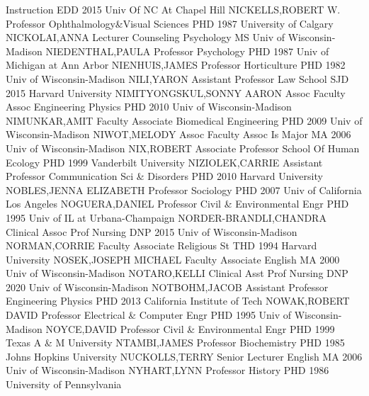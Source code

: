 \documentclass[
]{article}
\begin{document}
Instruction \textbar EDD 2015 Univ Of NC At Chapel Hill
\textbar NICKELLS,ROBERT W. \textbar{}  \textbar Professor
\textbar Ophthalmology\&Visual Sciences \textbar PHD 1987 University of
Calgary \textbar NICKOLAI,ANNA \textbar{}  \textbar Lecturer
\textbar Counseling Psychology \textbar MS Univ of Wisconsin-Madison
\textbar NIEDENTHAL,PAULA \textbar{}  \textbar Professor
\textbar Psychology \textbar PHD 1987 Univ of Michigan at Ann Arbor
\textbar NIENHUIS,JAMES \textbar{}  \textbar Professor
\textbar Horticulture \textbar PHD 1982 Univ of Wisconsin-Madison
\textbar NILI,YARON \textbar{}  \textbar Assistant Professor
\textbar Law School \textbar SJD 2015 Harvard University
\textbar NIMITYONGSKUL,SONNY AARON \textbar{} 
\textbar Assoc Faculty Assoc \textbar Engineering Physics \textbar PHD
2010 Univ of Wisconsin-Madison \textbar NIMUNKAR,AMIT \textbar{}
 \textbar Faculty Associate \textbar Biomedical Engineering
\textbar PHD 2009 Univ of Wisconsin-Madison \textbar NIWOT,MELODY
\textbar{}  \textbar Assoc Faculty Assoc \textbar Is Major
\textbar MA 2006 Univ of Wisconsin-Madison \textbar NIX,ROBERT
\textbar{}  \textbar Associate Professor \textbar School Of
Human Ecology \textbar PHD 1999 Vanderbilt University
\textbar NIZIOLEK,CARRIE \textbar{}  \textbar Assistant
Professor \textbar Communication Sci \& Disorders \textbar PHD 2010
Harvard University \textbar NOBLES,JENNA ELIZABETH \textbar{}
 \textbar Professor \textbar Sociology \textbar PHD 2007
Univ of California Los Angeles \textbar NOGUERA,DANIEL \textbar{}
 \textbar Professor \textbar Civil \& Environmental Engr
\textbar PHD 1995 Univ of IL at Urbana-Champaign
\textbar NORDER-BRANDLI,CHANDRA \textbar{} 
\textbar Clinical Assoc Prof \textbar Nursing \textbar DNP 2015 Univ of
Wisconsin-Madison \textbar NORMAN,CORRIE \textbar{} 
\textbar Faculty Associate \textbar Religious St \textbar THD 1994
Harvard University \textbar NOSEK,JOSEPH MICHAEL \textbar{} 
\textbar Faculty Associate \textbar English \textbar MA 2000 Univ of
Wisconsin-Madison \textbar NOTARO,KELLI \textbar{} 
\textbar Clinical Asst Prof \textbar Nursing \textbar DNP 2020 Univ of
Wisconsin-Madison \textbar NOTBOHM,JACOB \textbar{} 
\textbar Assistant Professor \textbar Engineering Physics \textbar PHD
2013 California Institute of Tech \textbar NOWAK,ROBERT DAVID \textbar{}
 \textbar Professor \textbar Electrical \& Computer Engr
\textbar PHD 1995 Univ of Wisconsin-Madison \textbar NOYCE,DAVID
\textbar{}  \textbar Professor \textbar Civil \&
Environmental Engr \textbar PHD 1999 Texas A \& M University
\textbar NTAMBI,JAMES \textbar{}  \textbar Professor
\textbar Biochemistry \textbar PHD 1985 Johns Hopkins University
\textbar NUCKOLLS,TERRY \textbar{}  \textbar Senior Lecturer
\textbar English \textbar MA 2006 Univ of Wisconsin-Madison
\textbar NYHART,LYNN \textbar{}  \textbar Professor
\textbar History \textbar PHD 1986 University of Pennsylvania \textbar{}
\end{document}
